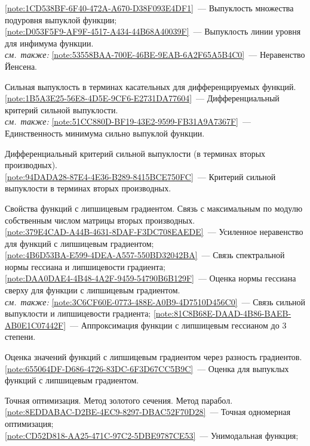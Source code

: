\begin{description}[font=\normalfont\bfseries]
  \cref{note:1CD538BF-6F40-472A-A670-D38F093E4DF1}~--- Выпуклость множества подуровня выпуклой функции;\\
  \cref{note:D053F5F9-AF9F-4517-A434-44B68A40039F}~--- Выпуклость линии уровня для инфимума функции.\\
  \emph{см.\ также:} \cref{note:53558BAA-700E-46BE-9EAB-6A2F65A5B4C0}~--- Неравенство Йенсена.
\item[Т7.] Сильная выпуклость в терминах касательных для дифференцируемых функций.\\
  \cref{note:1B5A3E25-56E8-4D5E-9CF6-E2731DA77604}~--- Дифференциальный критерий сильной выпуклости.\\
  \emph{см.\ также:} \cref{note:51CC880D-BF19-43E2-9599-FB31A9A7367F}~--- Единственность минимума сильно выпуклой функции.
\item[Т8.] Дифференциальный критерий сильной выпуклости (в терминах вторых производных).\\
  \cref{note:94DADA28-87E4-4E36-B289-8415BCE750FC}~--- Критерий сильной выпуклости в терминах вторых производных.
\item[Т9.] Свойства функций с липшицевым градиентом. Связь с максимальным по модулю собственным числом матрицы вторых производных.\\
  \cref{note:379E4CAD-A44B-4631-8DAF-F3DC708EAEDE}~--- Усиленное неравенство для функций с липшицевым градиентом;\\
  \cref{note:4B6D53BA-E599-4DEA-A557-550BD32042BA}~--- Связь спектральной нормы гессиана и липшицевости градиента;\\
  \cref{note:DAA0DAE4-4B48-4A2F-9459-54790B6B129F}~--- Оценка нормы гессиана сверху для функции с липшицевым градиентом.\\
  \emph{см.\ также:} \cref{note:3C6CF60E-0773-488E-A0B9-4D7510D456C0}~--- Связь сильной выпуклости и липшицевости градиента; \cref{note:81C8B68E-DAAD-4B86-BAEB-AB0E1C07442F}~--- Аппроксимация функции с липшицевым гессианом до 3 степени.
\item[Т10.] Оценка значений функций с липшицевым градиентом через разность градиентов.\\
  \cref{note:655064DF-D686-4726-83DC-6F3D67CC5B9C}~--- Оценка для выпуклых функций с липшицевым градиентом.
\item[Т11.] Точная оптимизация. Метод золотого сечения. Метод парабол.\\
  \cref{note:8EDDABAC-D2BE-4EC9-8297-DBAC52F70D28}~--- Точная одномерная оптимизация;\\
  \cref{note:CD52D818-AA25-471C-97C2-5DBE9787CE53}~--- Унимодальная функция;\\

\end{description}
